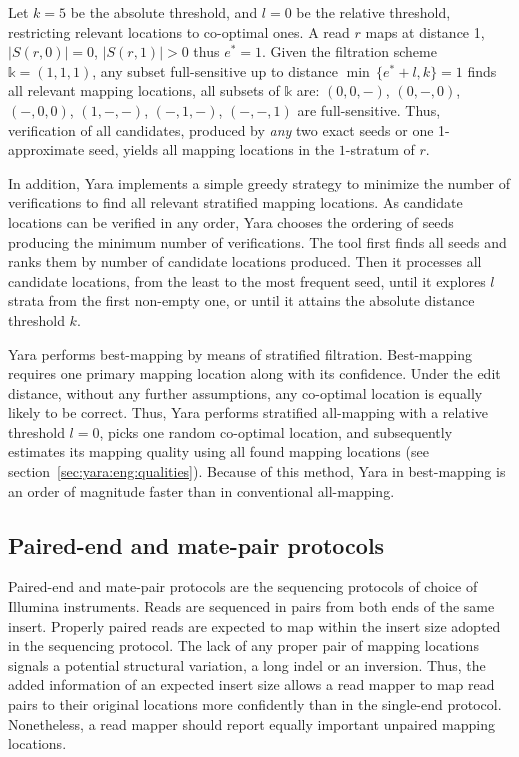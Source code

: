 \begin{example}
Let $k=5$ be the absolute threshold, and $l=0$ be the relative threshold, restricting relevant locations to co-optimal ones.
A read $r$ maps at distance 1, \ie $|S(r,0)| = 0$, $|S(r,1)| > 0$ thus $e^* = 1$.
Given the filtration scheme $\mathbb{k}=(1,1,1)$, any subset full-sensitive up to distance $\min \,\{ e^*+l, k\} = 1$ finds all relevant mapping locations, \ie all subsets of $\mathbb{k}$ are: $(0,0,-)$, $(0,-,0)$, $(-,0,0)$, $(1,-,-)$, $(-,1,-)$, $(-,-,1)$ are full-sensitive.
Thus, verification of all candidates, produced by \emph{any} two exact seeds or one 1-approximate seed, yields all mapping locations in the $1$-stratum of $r$.
\end{example}

In addition, Yara implements a simple greedy strategy to minimize the number of verifications to find all relevant stratified mapping locations.
As candidate locations can be verified in any order, Yara chooses the ordering of seeds producing the minimum number of verifications.
The tool first finds all seeds and ranks them by number of candidate locations produced.
Then it processes all candidate locations, from the least to the most frequent seed, until it explores $l$ strata from the first non-empty one, or until it attains the absolute distance threshold $k$.

Yara performs best-mapping by means of stratified filtration.
Best-mapping requires one primary mapping location along with its confidence.
Under the edit distance, without any further assumptions, any co-optimal location is equally likely to be correct.
Thus, Yara performs stratified all-mapping with a relative threshold $l=0$, picks one random co-optimal location, and subsequently estimates its mapping quality using all found mapping locations (see section~\ref{sec:yara:eng:qualities}).
Because of this method, Yara in best-mapping is an order of magnitude faster than in conventional all-mapping.



\subsection{Paired-end and mate-pair protocols}
\label{sec:yara:eng:pairs}
Paired-end and mate-pair protocols are the sequencing protocols of choice of Illumina instruments.
Reads are sequenced in pairs from both ends of the same insert.
Properly paired reads are expected to map within the insert size adopted in the sequencing protocol.
The lack of any proper pair of mapping locations signals a potential structural variation, \eg a long indel or an inversion.
Thus, the added information of an expected insert size allows a read mapper to map read pairs to their original locations more confidently than in the single-end protocol.
Nonetheless, a read mapper should report equally important unpaired mapping locations.

